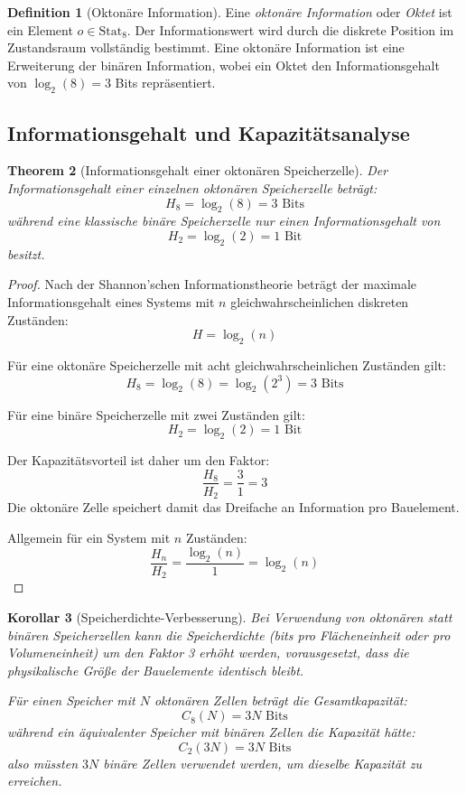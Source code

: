\documentclass[12pt, a4paper]{article}
\newtheorem{theorem}{Theorem}[section]
\newtheorem{corollary}[theorem]{Korollar}
\theoremstyle{definition}
\newtheorem{definition}[theorem]{Definition}
\theoremstyle{remark}
\newcommand{\Stat}{\mathrm{Stat}}
\begin{document}
\begin{definition}[Oktonäre Information]
\label{def:oktonaere_info}
Eine \emph{oktonäre Information} oder \emph{Oktet} ist ein Element $o \in \Stat_8$. Der Informationswert wird durch die diskrete Position im Zustandsraum vollständig bestimmt. Eine oktonäre Information ist eine Erweiterung der binären Information, wobei ein Oktet den Informationsgehalt von $\log_2(8) = 3$ Bits repräsentiert.
\end{definition}

\subsection{Informationsgehalt und Kapazitätsanalyse}
\label{subsec:kapazitaetsanalyse}

\begin{theorem}[Informationsgehalt einer oktonären Speicherzelle]
\label{thm:oktonaerer_informationsgehalt}
Der Informationsgehalt einer einzelnen oktonären Speicherzelle beträgt:
\[
H_8 = \log_2(8) = 3 \text{ Bits}
\]
während eine klassische binäre Speicherzelle nur einen Informationsgehalt von
\[
H_2 = \log_2(2) = 1 \text{ Bit}
\]
besitzt.
\end{theorem}

\begin{proof}
Nach der Shannon'schen Informationstheorie \cite{shannon1938} beträgt der maximale Informationsgehalt eines Systems mit $n$ gleichwahrscheinlichen diskreten Zuständen:
\[
H = \log_2(n)
\]

Für eine oktonäre Speicherzelle mit acht gleichwahrscheinlichen Zuständen gilt:
\[
H_8 = \log_2(8) = \log_2(2^3) = 3 \text{ Bits}
\]

Für eine binäre Speicherzelle mit zwei Zuständen gilt:
\[
H_2 = \log_2(2) = 1 \text{ Bit}
\]

Der Kapazitätsvorteil ist daher um den Faktor:
\[
\frac{H_8}{H_2} = \frac{3}{1} = 3
\]
Die oktonäre Zelle speichert damit das Dreifache an Information pro Bauelement.

Allgemein für ein System mit $n$ Zuständen:
\[
\frac{H_n}{H_2} = \frac{\log_2(n)}{1} = \log_2(n)
\]
\end{proof}

\begin{corollary}[Speicherdichte-Verbesserung]
\label{cor:speicherdichte_verbesserung}
Bei Verwendung von oktonären statt binären Speicherzellen kann die Speicherdichte (bits pro Flächeneinheit oder pro Volumeneinheit) um den Faktor 3 erhöht werden, vorausgesetzt, dass die physikalische Größe der Bauelemente identisch bleibt.

Für einen Speicher mit $N$ oktonären Zellen beträgt die Gesamtkapazität:
\[
C_8(N) = 3N \text{ Bits}
\]
während ein äquivalenter Speicher mit binären Zellen die Kapazität hätte:
\[
C_2(3N) = 3N \text{ Bits}
\]
also müssten $3N$ binäre Zellen verwendet werden, um dieselbe Kapazität zu erreichen.
\end{corollary}
\end{document}
